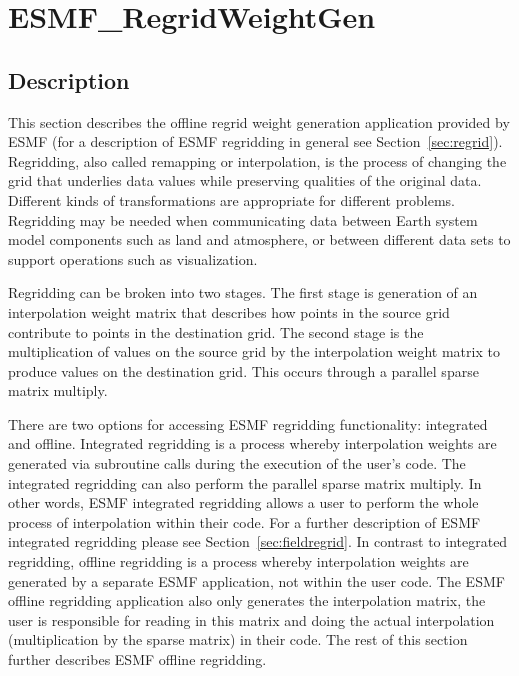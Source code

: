 
\section{ESMF\_RegridWeightGen}
\label{sec:ESMF_RegridWeightGen}

\subsection{Description}

This section describes the offline regrid weight generation application provided by ESMF (for a description of ESMF regridding in general see Section~\ref{sec:regrid}). Regridding, also called remapping or interpolation, is the process of changing the grid that underlies data values while preserving qualities of the original data. Different kinds of transformations are appropriate for different problems. Regridding may be needed when communicating data between Earth system model components such as land and atmosphere, or between different data sets to support operations such as visualization. 

Regridding can be broken into two stages. The first stage is generation of an interpolation weight matrix that describes how points in
the source grid contribute to points in the destination grid. The second stage is the multiplication of values on the source grid by the
interpolation weight matrix to produce values on the destination grid. This occurs through a parallel sparse matrix multiply.

There are two options for accessing ESMF regridding functionality: integrated and offline. Integrated regridding is a process whereby interpolation
weights are generated via subroutine calls during the execution of the user's code. The integrated regridding can also perform the parallel sparse
matrix multiply. In other words, ESMF integrated regridding allows a user to perform the whole process of interpolation within their code.
For a further description of ESMF integrated regridding please see Section~\ref{sec:fieldregrid}. 
In contrast to integrated regridding,
offline regridding is a process whereby interpolation weights are generated by a separate ESMF application, not within the user code. The ESMF offline
regridding application also only generates the interpolation matrix, the user is responsible for reading in this matrix and doing the actual interpolation
(multiplication by the sparse matrix) in their code. The rest of this section further describes ESMF offline regridding.

